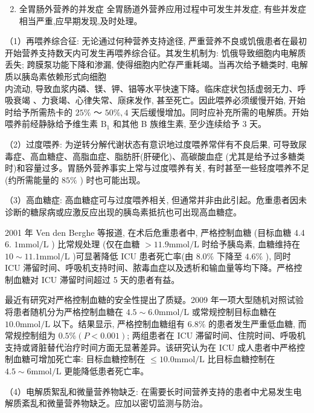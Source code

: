\documentclass[10pt]{article}
\begin{document}
\begin{enumerate}
  \setcounter{enumi}{1}
  \item 全胃肠外营养的并发症 全胃肠道外营养应用过程中可发生并发症, 有些并发症相当严重,应早期发现,及时处理。
\end{enumerate}

（1）再喂养综合征: 无论通过何种营养支持途径, 严重营养不良或饥俄患者在最初开始营养支持数天内可发生再喂养综合征。其发生机制为: 饥俄导致细胞内电解质丢失; 跨膜泵功能下降和渗漏, 使得细胞内贮存严重耗竭。当再次给予糖类时, 电解质以胰岛素依赖形式向细胞\\
内流动, 导致血浆内磷、镁、钾、锠等水平快速下降。临床症状包括虚弱无力、呼吸衰竭 、力衰竭、心律失常、庼㾁发作, 甚至死亡。因此喂养必须缓慢开始, 开始时给予所需热卡的 $25 \%$ ～ $50 \%, 4$ 天后缓慢增加。同时应补充所需的电解质。开始喂养前经静脉给予维生素 $\mathrm{B}_{1}$ 和其他 B 族维生素, 至少连续给予 3 天。

（2）过度喂养: 为逆转分解代谢状态有意识地过度喂养常伴有不良后果, 可导致尿毒症、高血糖症、高脂血症、脂肪肝(肝硬化)、高碳酸血症 (尤其是给予过多糖类时)和容量过多。胃肠外营养事实上常与过度喂养有关, 有时甚至一些轻度喂养不足 (约所需能量的 $85 \%$ ) 时也可能出现。

（3）高血糖症: 高血糖症可与过度喂养相关, 但通常并非由此引起。危重患者因未诊断的糖尿病或应激反应出现的胰岛素抵抗也可出现高血糖症。

2001 年 Ven den Berghe 等报道, 在术后危重患者中, 严格控制血糖 (目标血糖 4.4 6. $1 \mathrm{mmol} / \mathrm{L}$ ) 比常规处理 (仅在血糖 $>11.9 \mathrm{mmol} / \mathrm{L}$ 时给予胰岛素, 血糖维持在 $10 \sim 11.1 \mathrm{mmol} / \mathrm{L}$ )可显著降低 ICU 患者死亡率(由 $8.0 \%$ 下降至 $4.6 \%$ ), 同时 ICU 滞留时间、呼吸机支持时间、脓毒血症以及透析和输血量等均下降。严格控制血糖对 ICU 滞留时间超过 5 天的患者有益。

最近有研究对严格控制血糖的安全性提出了质疑。2009 年一项大型随机对照试验将患者随机分为严格控制血糖在 $4.5 \sim 6.0 \mathrm{mmol} / \mathrm{L}$ 或常规控制目标血糖在 $10.0 \mathrm{mmol} / \mathrm{L}$ 以下。结果显示, 严格控制血糖组有 $6.8 \%$ 的患者发生严重低血糖, 而常规控制组为 $0.5 \%(P<0.001)$; 两组患者在 ICU 滞留时间、住院时间、呼吸机支持或肾脏替代治疗时间方面无显著差异。该研究认为在 ICU 成人患者中严格控制血糖可增加死亡率: 目标血糖控制在 $\leqslant 10.0 \mathrm{mmol} / \mathrm{L}$ 比目标血糖控制在 $4.5 \sim 6 \mathrm{mmol} / \mathrm{L}$ 更能降低患者死亡率。

（4）电解质絮乱和微量营养物缺乏: 在需要长时间营养支持的患者中尤易发生电解质紊乱和微量营养物缺乏。应加以密切监测与防治。
\end{document}
